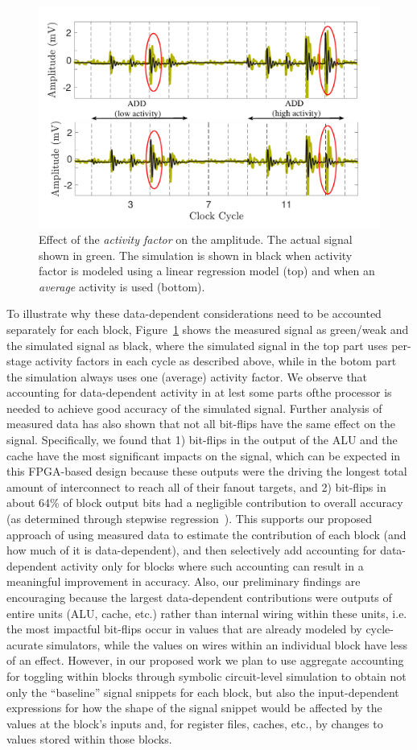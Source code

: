 \begin{figure}
	\centering
	\includegraphics[width=0.4\columnwidth]{figure/alpha2.pdf}
	\caption{Effect of the \textit{activity factor} on the amplitude. The actual signal shown in green. The simulation is shown in black when activity factor is modeled using a linear regression model (top) and when an \textit{average} activity is used (bottom).}
	\label{fig:alpha}
\end{figure}
To illustrate why these data-dependent considerations need to be accounted separately for each block, Figure~\ref{fig:alpha} shows the measured signal as green/weak and the simulated signal as black, where the simulated signal in the top part uses per-stage activity factors in each cycle as described above, while in the botom part the simulation always uses one (average) activity factor. We observe that accounting for data-dependent activity in at lest some parts ofthe processor is needed to achieve good accuracy of the simulated signal. Further analysis of measured data has also shown that not all bit-flips have the same effect on the signal. Specifically, we found that 1) bit-flips in the output of the ALU and the cache have the most significant impacts on the signal, which can be expected in this FPGA-based design because these outputs were the driving the longest total amount of interconnect to reach all of their fanout targets, and 2) bit-flips in about 64\% of block output bits had a negligible contribution to overall accuracy (as determined through stepwise regression~\cite{f-test}). This supports our proposed approach of using measured data to estimate the contribution of each block (and how much of it is data-dependent), and then selectively add accounting for data-dependent activity only for blocks where such accounting can result in a meaningful improvement in accuracy. Also, our preliminary findings are encouraging because the largest data-dependent contributions were outputs of entire units (ALU, cache, etc.) rather than internal wiring within these units, i.e. the most impactful bit-flips occur in values that are already modeled by cycle-acurate simulators, while the values on wires within an individual block have less of an effect. However, in our proposed work we plan to use aggregate accounting for toggling within blocks through symbolic circuit-level simulation to obtain not only the ``baseline'' signal snippets for each block, but also the input-dependent expressions for how the shape of the signal snippet would be affected by the values at the block's inputs and, for register files, caches, etc., by changes to values stored within those blocks.

